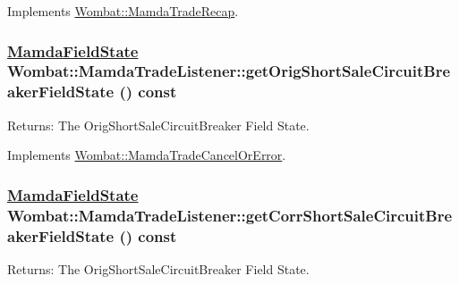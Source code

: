 Implements \hyperlink{classWombat_1_1MamdaTradeRecap_6808f080463130d2426dad0cc2ba9c16}{Wombat::Mamda\-Trade\-Recap}.\hypertarget{classWombat_1_1MamdaTradeListener_1035dcb4392a8dbab128ae62cf9a6607}{
\subsubsection[getOrigShortSaleCircuitBreakerFieldState]{\setlength{\rightskip}{0pt plus 5cm}\hyperlink{namespaceWombat_93aac974f2ab713554fd12a1fa3b7d2a}{Mamda\-Field\-State} Wombat::Mamda\-Trade\-Listener::get\-Orig\-Short\-Sale\-Circuit\-Breaker\-Field\-State () const}}
\label{classWombat_1_1MamdaTradeListener_1035dcb4392a8dbab128ae62cf9a6607}


\begin{Desc}
\item[Returns:]The Orig\-Short\-Sale\-Circuit\-Breaker Field State. \end{Desc}


Implements \hyperlink{classWombat_1_1MamdaTradeCancelOrError_5d43acfae05347c26f47fab7f0fcdd95}{Wombat::Mamda\-Trade\-Cancel\-Or\-Error}.\hypertarget{classWombat_1_1MamdaTradeListener_a9ee67b51889ddb8e79a7a8a3d81af5f}{
\subsubsection[getCorrShortSaleCircuitBreakerFieldState]{\setlength{\rightskip}{0pt plus 5cm}\hyperlink{namespaceWombat_93aac974f2ab713554fd12a1fa3b7d2a}{Mamda\-Field\-State} Wombat::Mamda\-Trade\-Listener::get\-Corr\-Short\-Sale\-Circuit\-Breaker\-Field\-State () const}}
\label{classWombat_1_1MamdaTradeListener_a9ee67b51889ddb8e79a7a8a3d81af5f}


\begin{Desc}
\item[Returns:]The Orig\-Short\-Sale\-Circuit\-Breaker Field State. \end{Desc}


